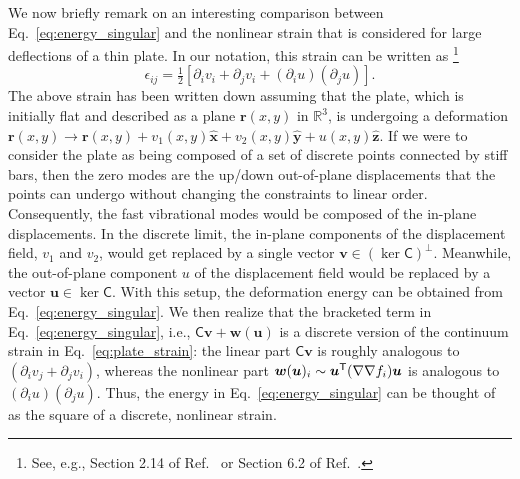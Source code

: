 We now briefly remark on an interesting comparison between Eq.~\eqref{eq:energy_singular} and the nonlinear strain that is considered for large deflections of a thin plate.
In our notation, this strain can be written as%
\footnote{See, e.g., Section 2.14 of Ref.~\cite{landau1986} or Section 6.2 of Ref.~\cite{nelson2004}.}
%
\begin{equation}
  \epsilon_{ij} = \tfrac{1}{2}\left[\partial_{i}v_{i} + \partial_{j}v_{i} + (\partial_{i}u)(\partial_{j}u)\right].
  \label{eq:plate_strain}
\end{equation}
%
The above strain has been written down assuming that the plate, which is initially flat and described as a plane $\bm{r}(x, y)$ in $\mathbb{R}^{3}$, is undergoing a deformation $\bm{r}(x, y) \to \bm{r}(x, y) + v_{1}(x, y)\hat{\bm{x}} + v_{2}(x, y)\hat{\bm{y}} + u(x, y)\hat{\bm{z}}$.
If we were to consider the plate as being composed of a set of discrete points connected by stiff bars, then the zero modes are the up/down out-of-plane displacements that the points can undergo without changing the constraints to linear order.
Consequently, the fast vibrational modes would be composed of the in-plane displacements.
In the discrete limit, the in-plane components of the displacement field, $v_{1}$ and $v_{2}$, would get replaced by a single vector $\bm{v} \in (\ker\mathsf{C})^{\perp}$.
Meanwhile, the out-of-plane component $u$ of the displacement field would be replaced by a vector $\bm{u} \in \ker\mathsf{C}$.
With this setup, the deformation energy can be obtained from Eq.~\eqref{eq:energy_singular}.
We then realize that the bracketed term in Eq.~\eqref{eq:energy_singular}, i.e., $\mathsf{C}\bm{v} + \bm{w}(\bm{u})$ is a discrete version of the continuum strain in Eq.~\eqref{eq:plate_strain}:
the linear part $\mathsf{C}\bm{v}$ is roughly analogous to $(\partial_{i}v_{j} + \partial_{j}v_{i})$, whereas the nonlinear part $\bm{w}(\bm{u})_{i} \sim \bm{u}^\mathsf{T}(\nabla\nabla f_{i})\bm{u}$ is analogous to $(\partial_{i} u)(\partial_{j} u)$.
Thus, the energy in Eq.~\eqref{eq:energy_singular} can be thought of as the square of a discrete, nonlinear strain.

